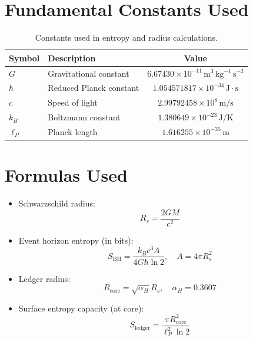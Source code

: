 \documentclass[a4paper, 12pt, oneside]{book}
\numberwithin{equation}{chapter}
\begin{document}
\section{Fundamental Constants Used}
\label{sec:Constants}

\begin{table}[ht]
\centering
\renewcommand{\arraystretch}{1.3}
\begin{tabular}{llc}
\toprule
\textbf{Symbol} & \textbf{Description} & \textbf{Value} \\
\midrule
\( G \) & Gravitational constant & \( 6.67430 \times 10^{-11} \,\mathrm{m^3\,kg^{-1}\,s^{-2}} \) \\
\( \hbar \) & Reduced Planck constant & \( 1.054571817 \times 10^{-34} \,\mathrm{J \cdot s} \) \\
\( c \) & Speed of light & \( 2.99792458 \times 10^8 \,\mathrm{m/s} \) \\
\( k_B \) & Boltzmann constant & \( 1.380649 \times 10^{-23} \,\mathrm{J/K} \) \\
\( \ell_P \) & Planck length & \( 1.616255 \times 10^{-35} \,\mathrm{m} \) \\
\bottomrule
\end{tabular}
\caption{Constants used in entropy and radius calculations.}
\label{tab:constants}
\end{table}

\section{Formulas Used}
\label{sec:Formulas}

\begin{itemize}
  \item Schwarzschild radius:
  \[
      R_s = \frac{2 G M}{c^2}
  \]
  \item Event horizon entropy (in bits):
  \[
      S_{\text{BH}} = \frac{k_B c^3 A}{4 G \hbar \ln 2},
      \quad
      A = 4\pi R_s^2
  \]
  \item Ledger radius:
  \[
      R_{\text{core}} = \sqrt{\alpha_H} R_s, \quad \alpha_H = 0.3607
  \]
  \item Surface entropy capacity (at core):
  \[
      S_{\text{ledger}} = \frac{\pi R_{\text{core}}^2}{\ell_P^2 \ln 2}
  \]
\end{itemize}
\end{document}
